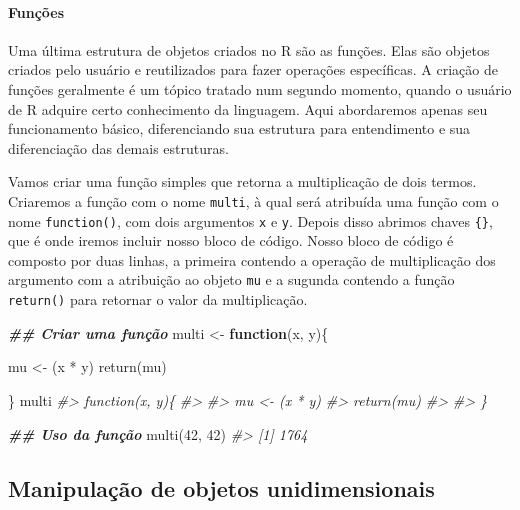 \documentclass[
]{book}
\newenvironment{Shaded}{\begin{snugshade}}{\end{snugshade}}
\newcommand{\CommentTok}[1]{\textcolor[rgb]{0.37,0.37,0.37}{\textit{#1}}}
\newcommand{\ControlFlowTok}[1]{\textcolor[rgb]{0.27,0.27,0.27}{\textbf{#1}}}
\newcommand{\DecValTok}[1]{\textcolor[rgb]{0.06,0.06,0.06}{#1}}
\newcommand{\DocumentationTok}[1]{\textcolor[rgb]{0.37,0.37,0.37}{\textbf{\textit{#1}}}}
\newcommand{\FunctionTok}[1]{\textcolor[rgb]{0,0,0}{#1}}
\newcommand{\NormalTok}[1]{#1}
\newcommand{\OtherTok}[1]{\textcolor[rgb]{0.37,0.37,0.37}{#1}}
\newcommand{\SpecialCharTok}[1]{\textcolor[rgb]{0,0,0}{#1}}
\begin{document}
\hypertarget{funuxe7uxf5es-1}{%
\paragraph{Funções}\label{funuxe7uxf5es-1}}

Uma última estrutura de objetos criados no R são as funções. Elas são objetos criados pelo usuário e reutilizados para fazer operações específicas. A criação de funções geralmente é um tópico tratado num segundo momento, quando o usuário de R adquire certo conhecimento da linguagem. Aqui abordaremos apenas seu funcionamento básico, diferenciando sua estrutura para entendimento e sua diferenciação das demais estruturas.

Vamos criar uma função simples que retorna a multiplicação de dois termos. Criaremos a função com o nome \texttt{multi}, à qual será atribuída uma função com o nome \texttt{function()}, com dois argumentos \texttt{x} e \texttt{y}. Depois disso abrimos chaves \texttt{\{\}}, que é onde iremos incluir nosso bloco de código. Nosso bloco de código é composto por duas linhas, a primeira contendo a operação de multiplicação dos argumento com a atribuição ao objeto \texttt{mu} e a sugunda contendo a função \texttt{return()} para retornar o valor da multiplicação.

\begin{Shaded}
\begin{Highlighting}[]
\DocumentationTok{\#\# Criar uma função}
\NormalTok{multi }\OtherTok{\textless{}{-}} \ControlFlowTok{function}\NormalTok{(x, y)\{}
  
\NormalTok{  mu }\OtherTok{\textless{}{-}}\NormalTok{ (x }\SpecialCharTok{*}\NormalTok{ y)}
  \FunctionTok{return}\NormalTok{(mu)}
 
\NormalTok{\}}
\NormalTok{multi}
\CommentTok{\#\textgreater{} function(x, y)\{}
\CommentTok{\#\textgreater{}   }
\CommentTok{\#\textgreater{}   mu \textless{}{-} (x * y)}
\CommentTok{\#\textgreater{}   return(mu)}
\CommentTok{\#\textgreater{}  }
\CommentTok{\#\textgreater{} \}}

\DocumentationTok{\#\# Uso da função}
\FunctionTok{multi}\NormalTok{(}\DecValTok{42}\NormalTok{, }\DecValTok{42}\NormalTok{)}
\CommentTok{\#\textgreater{} [1] 1764}
\end{Highlighting}
\end{Shaded}

\hypertarget{manipulauxe7uxe3o-de-objetos-unidimensionais}{%
\subsection{Manipulação de objetos unidimensionais}\label{manipulauxe7uxe3o-de-objetos-unidimensionais}}
\end{document}
